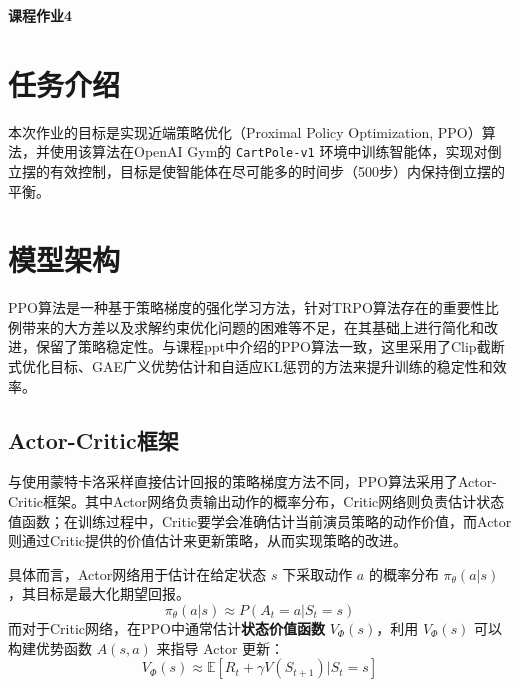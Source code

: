 \documentclass[11pt]{article}
\begin{document}
	\pagestyle{fancy}
	\chead{}
	
	\begin{center}
		{\LARGE \bf 课程作业4} 
	\end{center}
	\begin{center}
		\large{}
	\end{center}

	\section{任务介绍}
	本次作业的目标是实现近端策略优化（Proximal Policy Optimization, PPO）算法，并使用该算法在OpenAI Gym的 \texttt{CartPole-v1} 环境中训练智能体，实现对倒立摆的有效控制，目标是使智能体在尽可能多的时间步（500步）内保持倒立摆的平衡。

	\section{模型架构}
    PPO算法是一种基于策略梯度的强化学习方法，针对TRPO算法存在的重要性比例带来的大方差以及求解约束优化问题的困难等不足，在其基础上进行简化和改进，保留了策略稳定性。与课程ppt中介绍的PPO算法一致，这里采用了Clip截断式优化目标、GAE广义优势估计和自适应KL惩罚的方法来提升训练的稳定性和效率。
    
    \subsection{Actor-Critic框架}
    与使用蒙特卡洛采样直接估计回报的策略梯度方法不同，PPO算法采用了Actor-Critic框架。其中Actor网络负责输出动作的概率分布，Critic网络则负责估计状态值函数；在训练过程中，Critic要学会准确估计当前演员策略的动作价值，而Actor则通过Critic提供的价值估计来更新策略，从而实现策略的改进。

    具体而言，Actor网络用于估计在给定状态 $s$ 下采取动作 $a$ 的概率分布 $\pi_\theta(a|s)$，其目标是最大化期望回报。
        \begin{equation}
            \pi_\theta(a|s) \approx P(A_t=a | S_t=s)
        \end{equation}
    而对于Critic网络，在PPO中通常估计\textbf{状态价值函数} $V_\Phi(s)$，利用 $V_\Phi(s)$ 可以构建优势函数 $A(s,a)$ 来指导 Actor 更新：
        \begin{equation}
            V_\Phi(s) \approx \mathbb{E}[R_t + \gamma V(S_{t+1}) | S_t=s]
        \end{equation}
\end{document}
